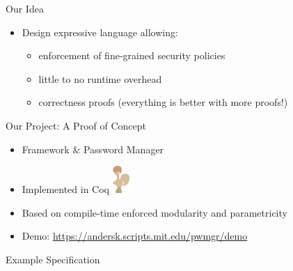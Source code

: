 \documentclass{beamer}
\newcommand{\fullwidth}[1]{\noindent\checkoddpage\makebox[0pt][r]{\makebox[\dimexpr1in+\hoffset+\ifoddpage\oddsidemargin\else\evensidemargin\fi][l]{#1}}}
\newcommand{\truecenter}[1]{\fullwidth{\parbox[c]{\paperwidth}{#1}}}
\def\untrusted#1{\save[].[#1]*[F]\frm{}\restore}
\def\trusted#1{\save[].[#1]*[F=]\frm{}\restore}
\begin{document}
\begin{frame}{\Huge Our Idea}
\Large
\begin{itemize}
  \item Design expressive language allowing:
  \begin{itemize}\Large
    \item enforcement of fine-grained security policies
    \item little to no runtime overhead \pause
    \item correctness proofs \small (everything is better with more proofs!)
  \end{itemize}
\end{itemize}
\end{frame}



\begin{frame}{\Huge Our Project: A Proof of Concept}
\Large
\begin{itemize}
  \item Framework \& Password Manager
  \item Implemented in Coq \includegraphics[width=0.05\textwidth]{coq-logo}
  \item Based on compile-time enforced modularity and parametricity
  \item Demo: \url{https://andersk.scripts.mit.edu/pwmgr/demo}
\end{itemize}
\end{frame}



\begin{frame}{\Huge Example Specification}
\Large
\vspace{-0.2in}
\truecenter{%
\[
\xymatrix@-0.5pc{
&\trusted{ddddddrrrr} \\
&&\untrusted{dddd}\txt{\phantom{UI}}& \txt{\phantom{Encrypt}} & \untrusted{dddd}\txt{\phantom{Net}}&& \\
&&\txt{\phantom{UI}}\ar[r]& \trusted{}\txt{\textbf{Encrypt}}\ar[r]     &                 \txt{\phantom{Net}}\ar@{=>}[rrr]^>{\txt{Network Out}}&&& \\
\ar@{=>}[rr]^<{\txt{User In\ \ \phantom{.}}}&&\txt{UI}&  \ar[u]\ar[d]\trusted{}\txt{\textbf{Secret Key}}     &                 \txt{Net}& \\
&&\txt{\phantom{UI}}&  \ar[l]\untrusted{}\txt{Decrypt}     & \ar[l] \txt{\phantom{Net}}&&&\ar@{=>}[lll]^<{\txt{Network In}} \\
&&\txt{\phantom{UI}}& \txt{\phantom{Encrypt}} & \txt{\phantom{Net}}&& \\
&&\txt{\phantom{UI}}& \txt{\phantom{Encrypt}} & \txt{\phantom{Net}}&& \\
}
\]
}
\end{frame}
\end{document}
